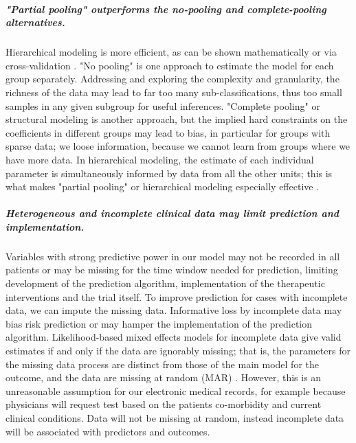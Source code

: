 \documentclass[11pt,notitlepage]{article}
\begin{document}
\subparagraph*{"Partial pooling" outperforms the no-pooling and complete-pooling alternatives.}
Hierarchical modeling is more efficient, as can be shown mathematically or via cross-validation \cite{Gelman-Hill_2014}. "No pooling" is one approach to estimate the model for each group separately. Addressing and exploring the complexity and granularity, the richness of the data may lead to far too many sub-classifications, thus too small samples in any given subgroup for useful inferences. "Complete pooling" or structural modeling is another approach, but the implied hard constraints on the coefficients in different groups may lead to bias, in particular for groups with sparse data; we loose information, because we cannot learn from groups where we have more data. In hierarchical modeling, the estimate of each individual parameter is simultaneously informed by data from all the other units; this is what makes "partial pooling" or hierarchical modeling especially effective \cite{Gelman_multilevel_2006}. 

\subparagraph*{Heterogeneous and incomplete clinical data may limit prediction and implementation.}
Variables with strong predictive power in our model may not be recorded in all patients or may be missing for the time window needed for prediction, limiting development of the prediction algorithm, implementation of the therapeutic interventions and the trial itself. To improve prediction for cases with incomplete data, we can impute the missing data. Informative loss by incomplete data may bias risk prediction or may hamper the implementation of the prediction algorithm. Likelihood-based mixed effects models for incomplete data give valid estimates if and only if the data are ignorably missing; that is, the parameters for the missing data process are distinct from those of the main model for the outcome, and the data are missing at random (MAR) \cite{Rubin_1976}. However, this is an unreasonable assumption for our electronic medical records, for example because physicians will request test based on the patients co-morbidity and current clinical conditions. Data will not be missing at random, instead incomplete data will be associated with predictors and outcomes.
\end{document}
